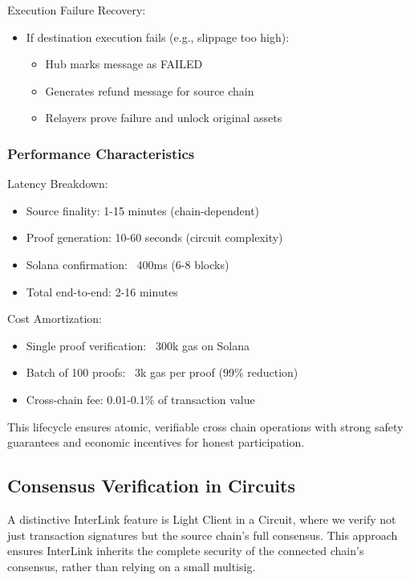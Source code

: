 \documentclass[11pt,a4paper]{article}
\begin{document}
Execution Failure Recovery:
\begin{itemize}
    \item If destination execution fails (e.g., slippage too high):
        \begin{itemize}
            \item Hub marks message as FAILED
            \item Generates refund message for source chain
            \item Relayers prove failure and unlock original assets
        \end{itemize}
\end{itemize}

\subsubsection*{Performance Characteristics}

Latency Breakdown:
\begin{itemize}
    \item Source finality: 1-15 minutes (chain-dependent)
    \item Proof generation: 10-60 seconds (circuit complexity)
    \item Solana confirmation: ~400ms (6-8 blocks)
    \item Total end-to-end: 2-16 minutes
\end{itemize}

Cost Amortization:
\begin{itemize}
    \item Single proof verification: ~300k gas on Solana
    \item Batch of 100 proofs: ~3k gas per proof (99\% reduction)
    \item Cross-chain fee: 0.01-0.1\% of transaction value
\end{itemize}

This lifecycle ensures atomic, verifiable cross chain operations with strong safety guarantees and economic incentives for honest participation.

\subsection{Consensus Verification in Circuits}
A distinctive InterLink feature is Light Client in a Circuit, where we verify not just transaction signatures but the source chain's full consensus. This approach ensures InterLink inherits the complete security of the connected chain's consensus, rather than relying on a small multisig.
\end{document}
